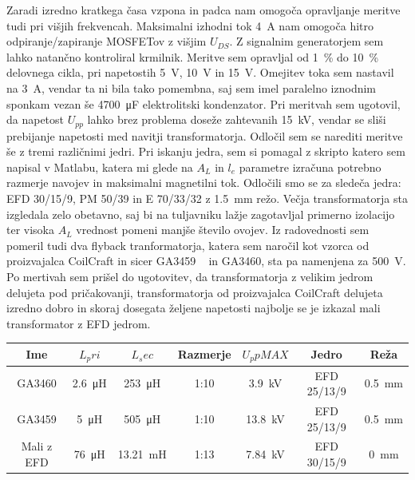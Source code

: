 \documentclass[a4paper,twoside,openright,12pt,slovene]{book}
\begin{document}
Zaradi izredno kratkega časa vzpona in padca nam omogoča opravljanje meritve tudi pri višjih frekvencah. Maksimalni izhodni tok \SI{4}{\ampere} nam omogoča hitro odpiranje/zapiranje MOSFETov z višjim \(U_{DS}\). Z signalnim generatorjem sem lahko natančno kontroliral krmilnik. Meritve sem opravljal od \SI{1}{\percent} do \SI{10}{\percent} delovnega cikla, pri napetostih \SI{5}{\volt}, \SI{10}{\volt} in \SI{15}{\volt}. Omejitev toka sem nastavil na \SI{3}{\ampere}, vendar ta ni bila tako pomembna, saj sem imel paralelno iznodnim sponkam vezan še \SI{4700}{\micro\farad} elektrolitski kondenzator. Pri meritvah sem ugotovil, da napetost \(U_{pp}\) lahko brez problema doseže zahtevanih \SI{15}{\kilo\volt}, vendar se sliši prebijanje napetosti med navitji transformatorja. Odločil sem se narediti meritve še z tremi različnimi jedri. Pri iskanju jedra, sem si pomagal z skripto katero sem napisal v Matlabu, katera mi glede na \(A_L\) in \(l_e\) parametre izračuna potrebno razmerje navojev in maksimalni magnetilni tok. Odločili smo se za sledeča jedra: EFD 30/15/9, PM 50/39 in E 70/33/32 z \SI{1.5}{\milli\meter} režo. Večja transformatorja sta izgledala zelo obetavno, saj bi na tuljavniku lažje zagotavljal primerno izolacijo ter visoka \(A_L\) vrednost pomeni manjše število ovojev. Iz radovednosti sem pomeril tudi dva flyback tranformatorja, katera sem naročil kot vzorca od proizvajalca CoilCraft in sicer GA3459 ~\cite{Coilcraft:GA3459} in GA3460, sta pa namenjena za \SI{500}{\volt}. Po mertivah sem prišel do ugotovitev, da transformatorja z velikim jedrom delujeta pod pričakovanji, transformatorja od proizvajalca CoilCraft delujeta izredno dobro in skoraj dosegata željene napetosti najbolje se je izkazal mali transformator z EFD jedrom. 
 
\begin{center}
\begin{tabular}{||c|c|c|c|c|c|c||}
\hline
Ime & \(L_pri\) & \(L_sec\) & Razmerje & \(U_ppMAX\) & Jedro & Reža \\ [0.5ex]
\hline\hline
GA3460 & \SI{2.6}{\micro\henry} & \SI{253}{\micro\henry} & 1:10 & \SI{3.9}{\kilo\volt} & EFD 25/13/9 & \SI{0.5}{\milli\meter} \\
\hline
GA3459 & \SI{5}{\micro\henry} & \SI{505}{\micro\henry} & 1:10 & \SI{13.8}{\kilo\volt} & EFD 25/13/9 & \SI{0.5}{\milli\meter} \\
\hline
Mali z EFD & \SI{76}{\micro\henry} & \SI{13.21}{\milli\henry} & 1:13 & \SI{7.84}{\kilo\volt} & EFD 30/15/9 & \SI{0}{\milli\meter} \\
\hline
\end{tabular}

\label{table:1}
\end{center}
\end{document}
